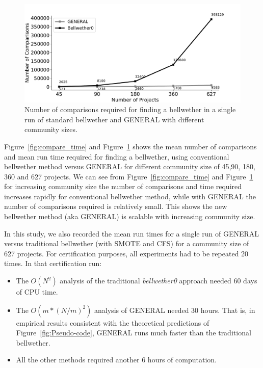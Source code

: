 \documentclass[10pt,journal,compsoc]{IEEEtran}
\newcommand{\fig}[1]{Figure~\ref{fig:#1}}
\newcommand{\bi}{\begin{itemize}}
\newcommand{\ei}{\end{itemize}}
\begin{document}
\begin{figure}[!t]
    \centering
    \includegraphics[width=\linewidth]{figs/compare.pdf}
    \caption{Number of comparisons required for finding a bellwether in a single run of standard bellwether and GENERAL with different community sizes.}
    \label{fig:compare}
\end{figure}




{\color{blue}\fig{compare_time} and \fig{compare} shows the mean number of comparisons and mean run time required for finding a bellwether, using conventional bellwether method versus GENERAL for different community size of 45,90, 180, 360 and 627 projects. We can see from \fig{compare_time} and \fig{compare} for increasing community size the number of comparisons and time required increases rapidly for conventional bellwether method, while with GENERAL the number of comparisons required is relatively small. This shows the new bellwether method (aka GENERAL) is scalable with increasing community size. }



In this study, we also recorded the mean run times for a single run of GENERAL versus traditional bellwether (with SMOTE and CFS) for a community size of 627 projects. For certification purposes, all experiments had to be repeated 20 times. In that certification run:

\bi
\item
The $O(N^2)$ analysis of the traditional {\em bellwether0} approach needed 60 days of CPU time.
\item 
The $O(m*(N/m)^2)$ analysis
of GENERAL needed 30  hours. That is, in empirical results consistent with the theoretical predictions of Figure~\ref{fig:Pseudo-code}, GENERAL runs much faster than the traditional bellwether.
\item 
All the other methods required another 6 hours of computation. 
\ei
\end{document}
